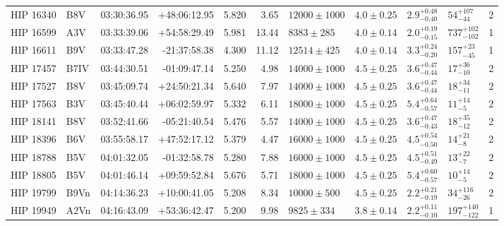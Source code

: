 \begin{landscape}
\begin{scriptsize}
\begin{longtable}{|l|lrrrrlllll|}
   HIP 16340 &      B8V &    03:30:36.95 &   +48:06:12.95 &   5.820 &      3.65 &  $12000 \pm 1000$ &  $4.0 \pm 0.25$ &  $2.9^{+0.48}_{-0.40}$ &     $54^{+107}_{-44}$ &       2 \\
   HIP 16599 &      A3V &    03:33:39.06 &   +54:58:29.49 &   5.981 &     13.44 &    $8383 \pm 285$ &  $4.0 \pm 0.14$ &  $2.0^{+0.19}_{-0.15}$ &   $737^{+102}_{-102}$ &       1 \\
   HIP 16611 &      B9V &    03:33:47.28 &   -21:37:58.38 &   4.300 &     11.12 &   $12514 \pm 425$ &  $4.0 \pm 0.14$ &  $3.3^{+0.24}_{-0.20}$ &     $157^{+23}_{-45}$ &       1 \\
   HIP 17457 &     B7IV &    03:44:30.51 &   -01:09:47.14 &   5.250 &      4.98 &  $14000 \pm 1000$ &  $4.5 \pm 0.25$ &  $3.6^{+0.47}_{-0.44}$ &      $17^{+36}_{-10}$ &       2 \\
   HIP 17527 &      B8V &    03:45:09.74 &   +24:50:21.34 &   5.640 &      7.97 &  $14000 \pm 1000$ &  $4.5 \pm 0.25$ &  $3.6^{+0.47}_{-0.44}$ &      $18^{+34}_{-11}$ &       2 \\
   HIP 17563 &      B3V &    03:45:40.44 &   +06:02:59.97 &   5.332 &      6.11 &  $18000 \pm 1000$ &  $4.5 \pm 0.25$ &  $5.4^{+0.64}_{-0.57}$ &       $11^{+14}_{-5}$ &       2 \\
   HIP 18141 &      B8V &    03:52:41.66 &   -05:21:40.54 &   5.476 &      5.57 &  $14000 \pm 1000$ &  $4.5 \pm 0.25$ &  $3.6^{+0.47}_{-0.43}$ &      $18^{+35}_{-12}$ &       2 \\
   HIP 18396 &      B6V &    03:55:58.17 &   +47:52:17.12 &   5.379 &      4.47 &  $16000 \pm 1000$ &  $4.5 \pm 0.25$ &  $4.5^{+0.54}_{-0.50}$ &       $14^{+21}_{-8}$ &       2 \\
   HIP 18788 &      B5V &    04:01:32.05 &   -01:32:58.78 &   5.280 &      7.88 &  $16000 \pm 1000$ &  $4.5 \pm 0.25$ &  $4.5^{+0.51}_{-0.49}$ &       $13^{+22}_{-7}$ &       2 \\
   HIP 18805 &      B5V &    04:01:46.14 &   +09:59:52.84 &   5.676 &      5.71 &  $18000 \pm 1000$ &  $4.5 \pm 0.25$ &  $5.4^{+0.60}_{-0.57}$ &       $10^{+14}_{-5}$ &       2 \\
   HIP 19799 &     B9Vn &    04:14:36.23 &   +10:00:41.05 &   5.208 &      8.34 &   $10000 \pm 500$ &  $4.5 \pm 0.25$ &  $2.2^{+0.21}_{-0.19}$ &     $34^{+116}_{-26}$ &       2 \\
   HIP 19949 &     A2Vn &    04:16:43.09 &   +53:36:42.47 &   5.200 &      9.98 &    $9825 \pm 334$ &  $3.8 \pm 0.14$ &  $2.2^{+0.11}_{-0.10}$ &   $197^{+140}_{-122}$ &       1 \\

\end{longtable}
\end{scriptsize}
\end{landscape}
